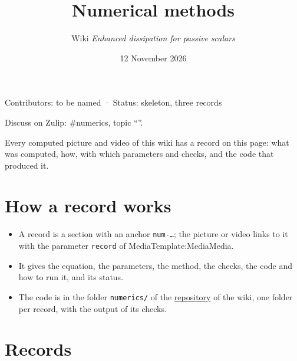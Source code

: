 \documentclass[11pt]{article}
\makeatletter
\theoremstyle{definition}
\theoremstyle{remark}
\def\ed@title{}\let\ed@maketitle\maketitle\renewcommand{\maketitle}{\let\ed@title\@title\ed@maketitle}
\newcommand{\pagestatus}[1]{{\par\centering\small#1\par}}
\newcommand{\zulip}[2][]{{\par\centering\small Discuss on Zulip: \##2, topic
  ``\ifx\relax#1\relax\ed@title\else#1\fi''.\par}\medskip}
\newcommand{\wikilink}[2]{\ifx\relax#2\relax#1\else#2\fi}
\makeatother
\begin{document}
\title{Numerical methods}
\author{Wiki \emph{Enhanced dissipation for passive scalars}}
\date{12 November 2026}
\maketitle
\pagestatus{Contributors: to be named · Status: skeleton, three records}
\zulip{numerics}

Every computed picture and video of this wiki has a record on this page: what was computed, how, with which parameters and checks, and the code that produced it.

\section{How a record works}
\begin{itemize}
  \item A record is a section with an anchor \texttt{num-…}; the picture or video links to it with the parameter \texttt{record} of \wikilink{Template:Media}{Media}.
  \item It gives the equation, the parameters, the method, the checks, the code and how to run it, and its status.
  \item The code is in the folder \texttt{numerics/} of the \href{https://github.com/endipa/endipa.github.io}{repository} of the wiki, one folder per record, with the output of its checks.
\end{itemize}

\section{Records}
\end{document}
